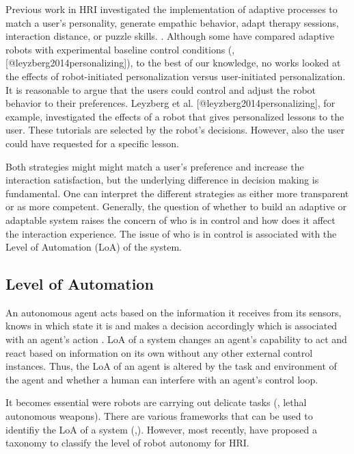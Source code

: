 Previous work in HRI investigated the implementation of adaptive processes to match a user's personality, generate empathic behavior, adapt therapy sessions, interaction distance, or puzzle skills.  \cite{tapus2008user,leite2011modelling,Tsiakas2016,mitsunaga2008adapting,leyzberg2014personalizing}. Although some have compared adaptive robots with experimental baseline control conditions (\eg{}, [@leyzberg2014personalizing]), to the best of our knowledge, no works looked at the effects of robot-initiated personalization versus user-initiated personalization. 
It is reasonable to argue that the users could control and adjust the robot behavior to their preferences. Leyzberg et al. [@leyzberg2014personalizing], for example, investigated the effects of a robot that gives personalized lessons to the user. These tutorials are selected by the robot's decisions. However, also the user could have requested for a specific lesson.  

Both strategies might might match a user's preference and increase the interaction satisfaction, but the underlying difference in decision making is fundamental. One can interpret the different strategies as either more transparent or as more competent. 
Generally, the question of whether to build an adaptive or adaptable system raises the concern of who is in control and how does it affect the interaction experience. The issue of who is in control is associated with the Level of Automation (LoA) of the system.

\subsection{Level of Automation}
An autonomous agent acts based on the information it receives from its sensors, knows in which state it is and makes a decision accordingly which is associated with an agent's action \cite{russell2016artificial}.
LoA of a system changes an agent's capability to act and react based on information on its own without any other external control instances.
Thus, the LoA of an agent is altered by the task and environment of the agent and whether a human can interfere with an agent's control loop. 

It becomes essential were robots are carrying out delicate tasks (\eg{}, lethal autonomous weapons). There are various frameworks that can be used to identifiy the LoA of a system (\eg{},\cite{sheridan1978human,endsley1995out}). However, most recently, \cite{beer2014toward} have proposed a taxonomy to classify the level of robot autonomy for HRI. 

